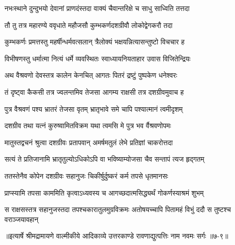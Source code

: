 \twolineshloka
{नभःस्थाने दुन्दुभयो देवानां प्राणदंस्तदा}
{वाक्यं चैवान्तरिक्षे च साधु साध्विति तत्तदा} %

\twolineshloka
{तौ तु तत्र महारण्ये ववृधाते महौजसौ}
{कुम्भकर्णदशग्रीवौ लोकोद्वेगकरौ तदा} %

\twolineshloka
{कुम्भकर्णः प्रमत्तस्तु महर्षीन्धर्मवत्सलान्}
{त्रैलोक्यं भक्षयन्नित्यासन्तुष्टो विचचार ह} %

\twolineshloka
{विभीषणस्तु धर्मात्मा नित्यं धर्मे व्यवस्थितः}
{स्वाध्यायनियताहार उवास विजितेन्द्रियः} %

\twolineshloka
{अथ वैश्रवणो देवस्तत्र कालेन केनचित्}
{आगतः पितरं द्रष्टुं पुष्पकेण धनेश्वरः} %

\twolineshloka
{तं दृष्ट्वा कैकसी तत्र ज्वलन्तमिव तेजसा}
{आगम्य राक्षसी तत्र दशग्रीवमुवाच ह} %

\twolineshloka
{पुत्र वैश्रवणं पश्य भ्रातरं तेजसा वृतम्}
{भ्रातृभावे समे चापि पश्यात्मानं त्वमीदृशम्} %

\twolineshloka
{दशग्रीव तथा यत्नं कुरुष्वामितविक्रम}
{यथा त्वमसि मे पुत्र भव र्वैश्रवणोपमः} %

\twolineshloka
{मातुस्तद्वचनं श्रुत्वा दशग्रीवः प्रतापवान्}
{अमर्षमतुलं लेभे प्रतिज्ञां चाकरोत्तदा} %

\twolineshloka
{सत्यं ते प्रतिजानामि भ्रातृतुल्योऽधिकोऽपि वा}
{भविष्याम्योजसा चैव सन्तापं त्यज हृद्गतम्} %

\twolineshloka
{ततस्तेनैव कोपेन दशग्रीवः सहानुजः}
{चिकीर्षुर्दुष्करं कर्म तपसे धृतमानसः} %

\twolineshloka
{प्राप्स्यामि तपसा काममिति कृत्वाऽध्यवस्य च}
{आगच्छदात्मसिद्ध्यर्थं गोकर्णस्याश्रमं शुभम्} %

\twolineshloka
{स राक्षसस्तत्र सहानुजस्तदा तपश्चकारातुलमुग्रविक्रमः}
{अतोषयच्चापि पितामहं विभुं ददौ स तुष्टश्च वराञ्जयावहान्} %


॥इत्यार्षे श्रीमद्रामायणे वाल्मीकीये आदिकाव्ये उत्तरकाण्डे रावणाद्युत्पत्तिः नाम नवमः सर्गः ॥७-९॥
